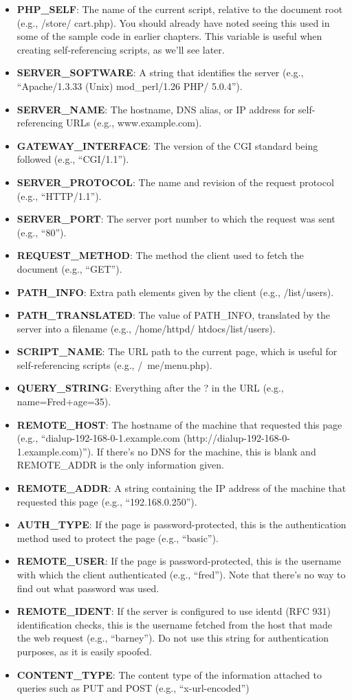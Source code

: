 \documentclass{report}
\begin{document}
\pagebreak 
{}
\begin{itemize}
\item \textbf{PHP\_SELF}: The name of the current script, relative to the document root (e.g., /store/ cart.php). You should already have noted seeing this used in some of the sample code in earlier chapters. This variable is useful when creating self-referencing scripts, as we’ll see later.
\item \textbf{SERVER\_SOFTWARE}: A string that identifies the server (e.g., “Apache/1.3.33 (Unix) mod\_perl/1.26 PHP/ 5.0.4”).
\item \textbf{SERVER\_NAME}: The hostname, DNS alias, or IP address for self-referencing URLs (e.g., www.example.com).
\item \textbf{GATEWAY\_INTERFACE}: The version of the CGI standard being followed (e.g., “CGI/1.1”).
\item \textbf{SERVER\_PROTOCOL}: The name and revision of the request protocol (e.g., “HTTP/1.1”).
\item \textbf{SERVER\_PORT}: The server port number to which the request was sent (e.g., “80”).
\item \textbf{REQUEST\_METHOD}: The method the client used to fetch the document (e.g., “GET”).
\item \textbf{PATH\_INFO}: Extra path elements given by the client (e.g., /list/users).
\item \textbf{PATH\_TRANSLATED}: The value of PATH\_INFO, translated by the server into a filename (e.g., /home/httpd/ htdocs/list/users).
\item \textbf{SCRIPT\_NAME}: The URL path to the current page, which is useful for self-referencing scripts (e.g., /~me/menu.php).
\item \textbf{QUERY\_STRING}: Everything after the ? in the URL (e.g., name=Fred+age=35).
\item \textbf{REMOTE\_HOST}: The hostname of the machine that requested this page (e.g., “dialup-192-168-0-1.example.com (http://dialup-192-168-0-1.example.com)”). If there’s no DNS for the machine, this is blank and REMOTE\_ADDR is the only information given.
\item \textbf{REMOTE\_ADDR}: A string containing the IP address of the machine that requested this page (e.g., “192.168.0.250”).
\item \textbf{AUTH\_TYPE}: If the page is password-protected, this is the authentication method used to protect the page (e.g., “basic”).
\item \textbf{REMOTE\_USER}: If the page is password-protected, this is the username with which the client authenticated (e.g., “fred”). Note that there’s no way to find out what password was used.
\item \textbf{REMOTE\_IDENT}: If the server is configured to use identd (RFC 931) identification checks, this is the username fetched from the host that made the web request (e.g., “barney”). Do not use this string for authentication purposes, as it is easily spoofed.
\item \textbf{CONTENT\_TYPE}: The content type of the information attached to queries such as PUT and POST (e.g., “x-url-encoded”)
\end{itemize}
\end{document}
